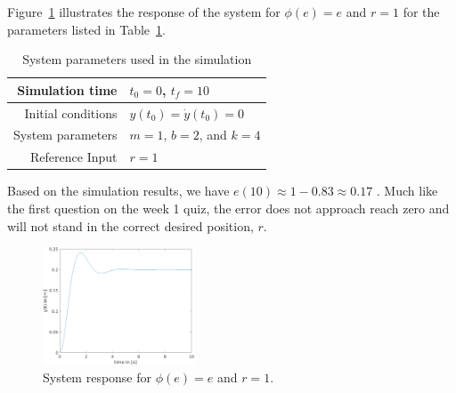\documentclass{article}
\begin{document}
Figure~\ref{fig:part-1_result} illustrates the response of the system for $\phi(e) = e$ and $r = 1$ for the parameters listed in Table~\ref{tab:paramters}.
\begin{table}[H]
    \centering
    \begin{tabular}{|r|l|}
        \hline
        Simulation time & $t_0 = 0$, $t_f = 10$  \\
        \hline
        Initial conditions & $y(t_0) = \dot{y}(t_0) = 0$\\
        \hline
        System parameters & $m = 1$, $b = 2$, and $k = 4$\\
        \hline
        Reference Input & $r = 1$\\
        \hline
    \end{tabular}
    \caption{System parameters used in the simulation}
    \label{tab:paramters}
\end{table}
Based on the simulation results, we have $e(10) \approx 1 - 0.83 \approx 0.17 $ . Much like the first question on the week 1 quiz, the error does not approach reach zero and will not stand in the correct desired position, $r$.
\begin{figure}[H]
    \centering
    \includegraphics[width = 0.4\textwidth]{figures/figure_1.png}
    \caption{System response for $\phi(e) = e$ and $r = 1$.}
    \label{fig:part-1_result}
\end{figure}
\end{document}
